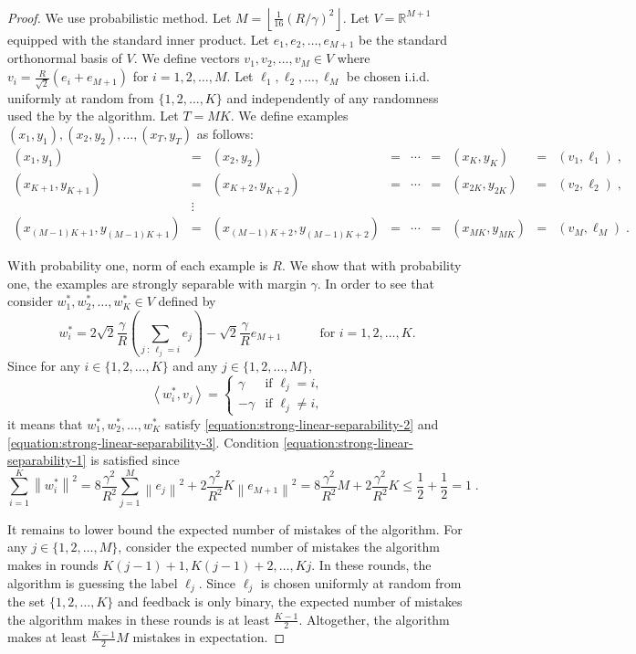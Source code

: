 \documentclass[12pt]{article}
\newcommand{\R}{\mathbb{R}}  %
\newcommand{\ip}[2]{\left\langle #1, #2 \right\rangle} %
\newcommand{\norm}[1]{\left\| #1 \right\|}  %
\begin{document}
\begin{proof}
We use probabilistic method. Let $M = \left\lfloor \frac{1}{16} (R/\gamma)^2 \right\rfloor$.
Let $V = \R^{M+1}$ equipped with the standard inner product.  Let $e_1, e_2,
\dots, e_{M+1}$ be the standard orthonormal basis of $V$. We define
vectors $v_1, v_2, \dots, v_M \in V$ where $v_i = \frac{R}{\sqrt{2}}(e_i +
e_{M+1})$ for $i=1,2,\dots,M$. Let $\ell_1, \ell_2, \dots, \ell_M$ be chosen
i.i.d. uniformly at random from $\{1,2,\dots,K\}$ and independently of any
randomness used the by the algorithm. Let $T = M K$. We define examples $(x_1,
y_1), (x_2, y_2), \dots, (x_T, y_T)$ as follows:
$$
\begin{array}{lclclclcl}
(x_1, y_1) & = & (x_2, y_2) & = & \cdots & = & (x_K, y_K) & = & (v_1, \ell_1) \; , \\
(x_{K+1},y_{K+1}) & = & (x_{K+2}, y_{K+2}) & = & \cdots & = & (x_{2K}, y_{2K}) & = & (v_2, \ell_2) \; , \\
& \vdots & \\
(x_{(M-1)K+1}, y_{(M-1)K+1})  & = & (x_{(M-1)K+2}, y_{(M-1)K+2}) & = & \cdots & = & (x_{MK}, y_{MK}) & = & (v_M, \ell_M) \; .
\end{array}
$$

With probability one, norm of each example is $R$. We show that with probability
one, the examples are strongly separable with margin $\gamma$. In order to see
that consider $w_1^*, w_2^*, \dots, w_K^* \in V$ defined by
$$
w_i^* = 2 \sqrt{2} \frac{\gamma}{R} \left( \sum_{j ~:~ \ell_j = i} e_j \right) - \sqrt{2} \frac{\gamma}{R} e_{M+1} \qquad \quad \text{for $i=1,2,\dots,K$.}
$$
Since for any $i \in \{1,2,\dots,K\}$ and any $j \in \{1,2,\dots,M\}$,
$$
\ip{w_i^*}{v_j} =
\begin{cases}
\gamma & \text{if $\ell_j = i$,} \\
- \gamma & \text{if $\ell_j \neq i$,}
\end{cases}
$$
it means that $w_1^*, w_2^*, \dots, w_K^*$ satisfy
\eqref{equation:strong-linear-separability-2} and
\eqref{equation:strong-linear-separability-3}. Condition \eqref{equation:strong-linear-separability-1}
is satisfied since
$$
\sum_{i=1}^K \norm{w_i^*}^2
= 8 \frac{\gamma^2}{R^2} \sum_{j=1}^M \norm{e_j}^2 + 2 \frac{\gamma^2}{R^2} K \norm{e_{M+1}}^2
= 8 \frac{\gamma^2}{R^2} M + 2 \frac{\gamma^2}{R^2} K
\le \frac{1}{2} + \frac{1}{2}
= 1 \; .
$$

It remains to lower bound the expected number of mistakes of the algorithm. For
any $j \in \{1,2,\dots,M\}$, consider the expected number of mistakes the
algorithm makes in rounds $K(j-1) + 1, K(j-1) + 2, \dots, Kj$. In these rounds,
the algorithm is guessing the label $\ell_j$. Since $\ell_j$ is chosen uniformly
at random from the set $\{1,2,\dots,K\}$ and feedback is only binary, the
expected number of mistakes the algorithm makes in these rounds is at least
$\frac{K-1}{2}$. Altogether, the algorithm makes at least $\frac{K-1}{2} M$
mistakes in expectation.


\end{proof}
\end{document}

